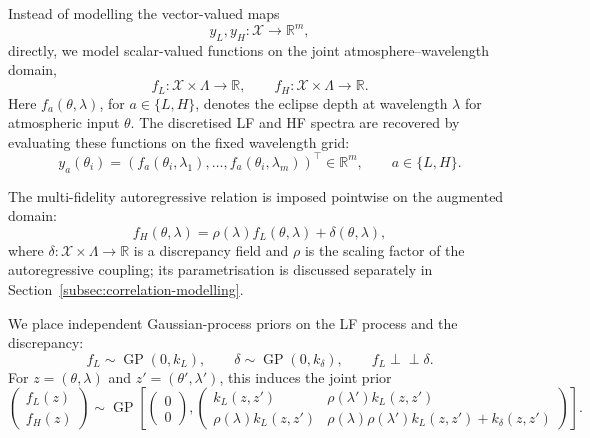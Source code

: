 \documentclass[11pt,a4paper]{article}
\begin{document}
Instead of modelling the vector-valued maps
\[
    y_L,y_H:\mathcal X\to\mathbb R^m,
\]
directly, we model scalar-valued functions on the joint
atmosphere--wavelength domain,
\[
    f_L:\mathcal X\times\Lambda\to\mathbb R,
    \qquad
    f_H:\mathcal X\times\Lambda\to\mathbb R.
\]
Here \(f_a(\theta,\lambda)\), for \(a\in\{L,H\}\), denotes the eclipse
depth at wavelength \(\lambda\) for atmospheric input \(\theta\). The
discretised LF and HF spectra are recovered by evaluating these functions
on the fixed wavelength grid:
\[
    y_a(\theta_i)
    =
    \left(
    f_a(\theta_i,\lambda_1),
    \ldots,
    f_a(\theta_i,\lambda_m)
    \right)^\top
    \in \mathbb R^m,
    \qquad
    a\in\{L,H\}.
\]

The multi-fidelity autoregressive relation is imposed pointwise on the
augmented domain:
\[
    f_H(\theta,\lambda)
    =
    \rho(\lambda) f_L(\theta,\lambda)
    +
    \delta(\theta,\lambda),
    \label{eq:model2-ar}
\]
where \(\delta:\mathcal X\times\Lambda\to\mathbb R\) is a discrepancy
field and \(\rho\) is the scaling factor of the autoregressive coupling;
its parametrisation is discussed separately in
Section~\ref{subsec:correlation-modelling}.

We place independent Gaussian-process priors on the LF process and the
discrepancy:
\[
    f_L \sim \operatorname{GP}(0,k_L),
    \qquad
    \delta \sim \operatorname{GP}(0,k_\delta),
    \qquad
    f_L \perp\!\!\!\perp \delta.
\]
For \(z=(\theta,\lambda)\) and \(z'=(\theta',\lambda')\), this induces the
joint prior
\[
    \begin{pmatrix}
    f_L(z)\\
    f_H(z)
    \end{pmatrix}
    \sim
    \operatorname{GP}
    \left[
    \begin{pmatrix}
    0\\
    0
    \end{pmatrix},
    \begin{pmatrix}
    k_L(z,z')
    &
    \rho(\lambda') k_L(z,z')
    \\[2mm]
    \rho(\lambda) k_L(z,z')
    &
    \rho(\lambda)\rho(\lambda') k_L(z,z')
    +
    k_\delta(z,z')
    \end{pmatrix}
    \right].
    \label{eq:model2-joint-prior}
\]
\end{document}
